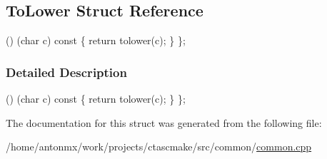 \hypertarget{structToLower}{
\subsection{ToLower Struct Reference}
\label{structToLower}
}


() (char c) const \{ return tolower(c); \} \};  




\subsubsection{Detailed Description}
() (char c) const \{ return tolower(c); \} \}; 

The documentation for this struct was generated from the following file:\begin{DoxyCompactItemize}
\item 
/home/antonmx/work/projects/ctascmake/src/common/\hyperlink{common_8cpp}{common.cpp}\end{DoxyCompactItemize}
